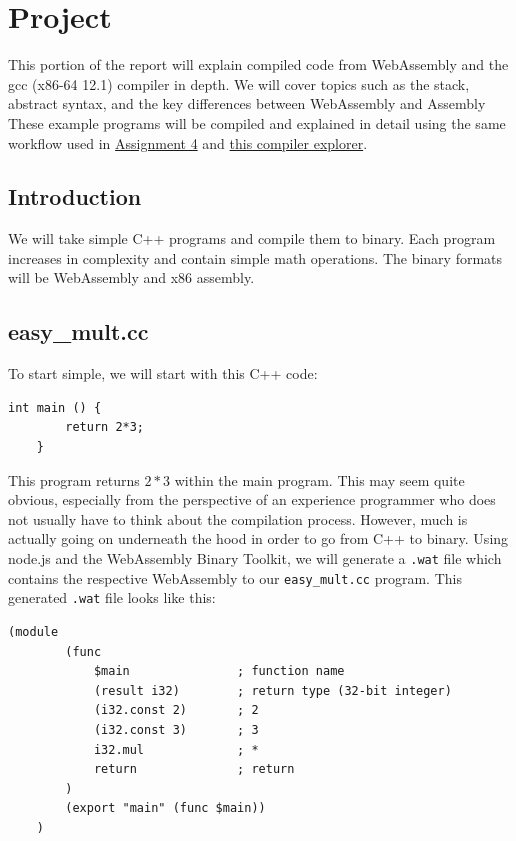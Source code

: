 \documentclass{article}
\theoremstyle{theorem}
\theoremstyle{definition}
\theoremstyle{remark}
\begin{document}
\section{Project}
\medskip\noindent
This portion of the report will explain compiled code from WebAssembly and the gcc (x86-64 12.1) compiler in depth. We will cover topics such as the stack, abstract syntax, and the key differences between WebAssembly and Assembly These example programs will be compiled and explained in detail using the same workflow used in \href{https://github.com/sfitzpatrickchapman/CPSC_402_Compiler_Construction/tree/main/Assignment4}{Assignment 4} and \href{https://godbolt.org/}{this compiler explorer}.

\subsection{Introduction}
We will take simple C++ programs and compile them to binary. Each program increases in complexity and contain simple math operations. The binary formats will be WebAssembly and x86 assembly.

\subsection{easy\_mult.cc}
To start simple, we will start with this C++ code:

\medskip\noindent
\begin{lstlisting}[style=CStyle]
    int main () {
        return 2*3;
    }
\end{lstlisting}

\medskip\noindent
This program returns $2*3$ within the main program. This may seem quite obvious, especially from the perspective of an experience programmer who does not usually have to think about the compilation process. However, much is actually going on underneath the hood in order to go from C++ to binary. Using node.js and the WebAssembly Binary Toolkit, we will generate a \verb|.wat| file which contains the respective WebAssembly to our \verb|easy_mult.cc| program. This generated \verb|.wat| file looks like this:

\medskip\noindent
\begin{lstlisting}[style=WasmStyle]
    (module
        (func
            $main               ; function name
            (result i32)        ; return type (32-bit integer)
            (i32.const 2)       ; 2
            (i32.const 3)       ; 3
            i32.mul             ; *
            return              ; return
        )
        (export "main" (func $main))
    )
\end{lstlisting}
\end{document}
